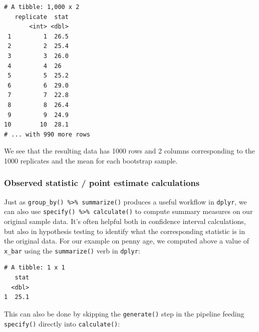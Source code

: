 \documentclass[12pt,]{krantz}
\makeatletter
\newenvironment{Shaded}{\begin{snugshade}}{\end{snugshade}}
\newcommand{\KeywordTok}[1]{\textcolor[rgb]{0.27,0.27,0.27}{\textbf{#1}}}
\newcommand{\DataTypeTok}[1]{\textcolor[rgb]{0.27,0.27,0.27}{#1}}
\newcommand{\DecValTok}[1]{\textcolor[rgb]{0.06,0.06,0.06}{#1}}
\newcommand{\StringTok}[1]{\textcolor[rgb]{0.5,0.5,0.5}{#1}}
\newcommand{\OperatorTok}[1]{\textcolor[rgb]{0.43,0.43,0.43}{\textbf{#1}}}
\newcommand{\NormalTok}[1]{#1}
\newenvironment{kframe}{%
\medskip{}
\setlength{\fboxsep}{.8em}
 \def\at@end@of@kframe{}%
 \ifinner\ifhmode%
  \def\at@end@of@kframe{\end{minipage}}%
  \begin{minipage}{\columnwidth}%
 \fi\fi%
 \def\FrameCommand##1{\hskip\@totalleftmargin \hskip-\fboxsep
 \colorbox{shadecolor}{##1}\hskip-\fboxsep
     \hskip-\linewidth \hskip-\@totalleftmargin \hskip\columnwidth}%
 \MakeFramed {\advance\hsize-\width
   \@totalleftmargin\z@ \linewidth\hsize
   \@setminipage}}%
 {\par\unskip\endMakeFramed%
 \at@end@of@kframe}
\renewenvironment{Shaded}{\begin{kframe}}{\end{kframe}}
\theoremstyle{definition}
\theoremstyle{definition}
\theoremstyle{definition}
\theoremstyle{remark}
\makeatother
\begin{document}
\begin{verbatim}
# A tibble: 1,000 x 2
   replicate  stat
       <int> <dbl>
 1         1  26.5
 2         2  25.4
 3         3  26.0
 4         4  26  
 5         5  25.2
 6         6  29.0
 7         7  22.8
 8         8  26.4
 9         9  24.9
10        10  28.1
# ... with 990 more rows
\end{verbatim}

We see that the resulting data has 1000 rows and 2 columns corresponding
to the 1000 replicates and the mean for each bootstrap sample.

\subsubsection*{Observed statistic / point estimate
calculations}\label{observed-statistic-point-estimate-calculations}

Just as \texttt{group\_by()\ \%\textgreater{}\%\ summarize()} produces a
useful workflow in \texttt{dplyr}, we can also use
\texttt{specify()\ \%\textgreater{}\%\ calculate()} to compute summary
measures on our original sample data. It's often helpful both in
confidence interval calculations, but also in hypothesis testing to
identify what the corresponding statistic is in the original data. For
our example on penny age, we computed above a value of \texttt{x\_bar}
using the \texttt{summarize()} verb in \texttt{dplyr}:

\begin{Shaded}
\end{Shaded}

\begin{verbatim}
# A tibble: 1 x 1
   stat
  <dbl>
1  25.1
\end{verbatim}

This can also be done by skipping the \texttt{generate()} step in the
pipeline feeding \texttt{specify()} directly into \texttt{calculate()}:

\begin{Shaded}
\end{Shaded}
\end{document}

